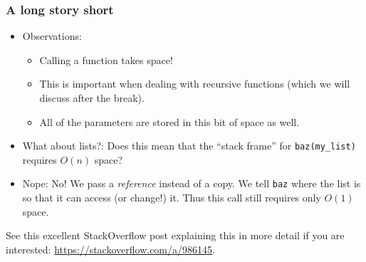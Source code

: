 



\begin{frame}
	\frametitle{A long story short}
	
		\begin{itemize}
		\item Observations:
	\begin{itemize}
		\item Calling a function takes space!
		\item This is important when dealing with recursive functions (which we will discuss after the break).
		\item All of the parameters are stored in this bit of space as well.
	\end{itemize}
	
		\item What about lists?:
		Does this mean that the ``stack frame'' for \texttt{baz(my\_list)} requires $O(n)$ space?
	
		\item Nope:
		No! We pass a \textit{reference} instead of a copy. We tell \texttt{baz} where the list is so that it can
		access (or change!) it. Thus this call still requires only $O(1)$ space.\\
	\end{itemize}

		{\scriptsize
		See this excellent StackOverflow post explaining this in more detail if you are interested:
	\url{https://stackoverflow.com/a/986145}.}
\end{frame}

